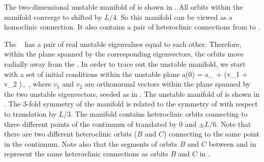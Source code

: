 The two-dimensional unstable manifold of  is shown in
.  All orbits within the manifold converge
to  shifted by $L/4$.  So this manifold can be viewed as a homoclinic
connection.  It also contains a pair of heteroclinic connections from
 to .

The \eqv\  has a pair of real unstable eigenvalues
equal to each other.  Therefore, within the plane spanned by the
corresponding eigenvectors, the orbits move radially away from
the \eqv.  In order to trace out the unstable manifold,
we start with a set of initial conditions within the unstable plane
\beq
 a(0) = a_{{}} + \epsilon(v_1 \cos \phi + v_2 \sin \phi)\,,
  \quad\phi\in[0,2\pi]\,, 
\label{unsManSeed}
\eeq
where $v_1$ and $v_2$ are orthonormal vectors within the
plane spanned by the two unstable eigenvectors, seeded as in
.
  The unstable manifold
of  is shown in .  The 3-fold symmetry of
the manifold is related to the symmetry of  with respect to
translation by $L/3$.  The manifold contains heteroclinic orbits
connecting  to three different points of the continuum of {\eqva}
translated by 0 and $\pm L/6$.  Note that there are two different
heteroclinic orbits ($B$ and $C$) connecting  to the same point in the
 continuum.  Note also that the segments of orbits $B$ and $C$
between  and  in 
represent the same heteroclinic connections as orbits $B$ and $C$ in
.

